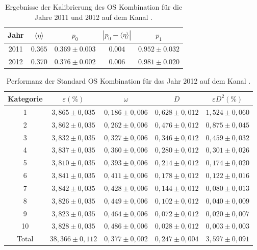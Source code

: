 \begin{table}[htbp]
	\centering
	\caption{Ergebnisse der Kalibrierung des OS Kombination für die Jahre \num{2011} und \num{2012} auf dem Kanal \BdToDpi.}
	\label{tab:result_OScomb}
	\begin{tabular}{ccccc}
	\toprule
       Jahr & $\langle\eta\rangle$ & $p_0$ & $\left|p_0-\langle\eta\rangle\right|$ & $p_1$ \\ 
       \midrule 
       2011 & $0{.}365$ & $0{.}369\pm0{.}003$ & $0{.}004$ & $0{.}952\pm0{.}032$ \\
      2012 & $0{.}370$ & $0{.}376\pm0{.}002$ & $0{.}006$ & $0{.}981\pm0{.}020$ \\ 
      \bottomrule
	\end{tabular}
\end{table} 
\begin{table}[htbp]
	\centering
	\caption{Performanz der Standard OS Kombination für das Jahr \num{2012} auf dem Kanal \BdToDpi.}
	\label{tab:2012_OScomb}
	\begin{tabular}{ccccc}
	\toprule
       Kategorie & $\varepsilon(\%)$ & $\omega$ & $D$ & $\varepsilon D^2(\%)$ \\ 
       \midrule
       1 & $3{,}865\pm0{,}035$ & $0{,}186\pm0{,}006$ & $0{,}628\pm0{,}012$ & $1{,}524\pm0{,}060$\\
       2 & $3{,}862\pm0{,}035$ & $0{,}262\pm0{,}006$ & $0{,}476\pm0{,}012$ & $0{,}875\pm0{,}045$\\ 
       3 & $3{,}832\pm0{,}035$ & $0{,}327\pm0{,}006$ & $0{,}346\pm0{,}012$ & $0{,}459\pm0{,}032$\\ 
       4 & $3{,}837\pm0{,}035$ & $0{,}360\pm0{,}006$ & $0{,}280\pm0{,}012$ & $0{,}301\pm0{,}026$\\ 
       5 & $3{,}810\pm0{,}035$ & $0{,}393\pm0{,}006$ & $0{,}214\pm0{,}012$ & $0{,}174\pm0{,}020$\\ 
       6 & $3{,}841\pm0{,}035$ & $0{,}411\pm0{,}006$ & $0{,}178\pm0{,}012$ & $0{,}122\pm0{,}016$\\ 
       7 & $3{,}842\pm0{,}035$ & $0{,}428\pm0{,}006$ & $0{,}144\pm0{,}012$ & $0{,}080\pm0{,}013$\\ 
       8 & $3{,}826\pm0{,}035$ & $0{,}449\pm0{,}006$ & $0{,}102\pm0{,}012$ & $0{,}040\pm0{,}009$\\ 
       9 & $3{,}823\pm0{,}035$ & $0{,}464\pm0{,}006$ & $0{,}072\pm0{,}012$ & $0{,}020\pm0{,}007$\\ 
      10 & $3{,}828\pm0{,}035$ & $0{,}486\pm0{,}006$ & $0{,}028\pm0{,}012$ & $0{,}003\pm0{,}003$\\ 
      \midrule
   Total & $38{,}366\pm0{,}112$& $0{,}377\pm0{,}002$ & $0{,}247\pm0{,}004$ & $3{,}597\pm0{,}091$\\ 
   \bottomrule
	\end{tabular}
\end{table}

